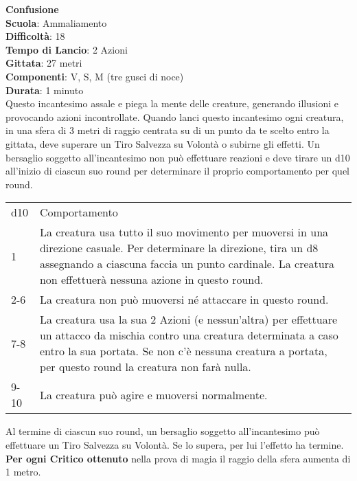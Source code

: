 \begin{multicols}{2}
\medskip\textbf{Confusione}\\
\textbf{Scuola}: Ammaliamento\\
\textbf{Difficoltà}:  18\\
\textbf{Tempo di Lancio}: 2 Azioni\\
\textbf{Gittata}: 27 metri\\
\textbf{Componenti}: V, S, M (tre gusci di noce)\\
\textbf{Durata}: 1 minuto\\
Questo incantesimo assale e piega la mente delle creature, generando illusioni e provocando azioni incontrollate. Quando lanci questo incantesimo ogni creatura, in una sfera di 3 metri di raggio centrata su di un punto da te scelto entro la gittata, deve superare un Tiro Salvezza su Volontà o subirne gli effetti. Un bersaglio soggetto all'incantesimo non può effettuare reazioni e deve tirare un d10 all'inizio di ciascun suo round per determinare il proprio comportamento per quel round. 

\medskip

\begin{tabularx}{0.45\textwidth}{lX}
	\hline 
d10 & Comportamento\\ 
1 & La creatura usa tutto il suo movimento per muoversi in una direzione casuale. Per determinare la direzione, tira un d8 assegnando a ciascuna faccia un punto cardinale. La
creatura non effettuerà nessuna azione in questo round. \\
2-6 & La creatura non può muoversi né attaccare in questo round.\\
7-8 & La creatura usa la sua 2 Azioni (e nessun'altra) per effettuare un attacco da mischia contro una creatura determinata a caso entro la sua portata. Se non c’è nessuna creatura a portata, per questo round la creatura non farà nulla.\\
9-10 & La creatura può agire e muoversi normalmente.\\
\end{tabularx} 

\medskip

Al termine di ciascun suo round, un bersaglio soggetto all'incantesimo può effettuare un Tiro Salvezza su Volontà. Se lo supera, per lui l’effetto ha termine. \\
\textbf{Per ogni Critico ottenuto} nella prova di magia il raggio della sfera aumenta di 1 metro.


\end{multicols}

